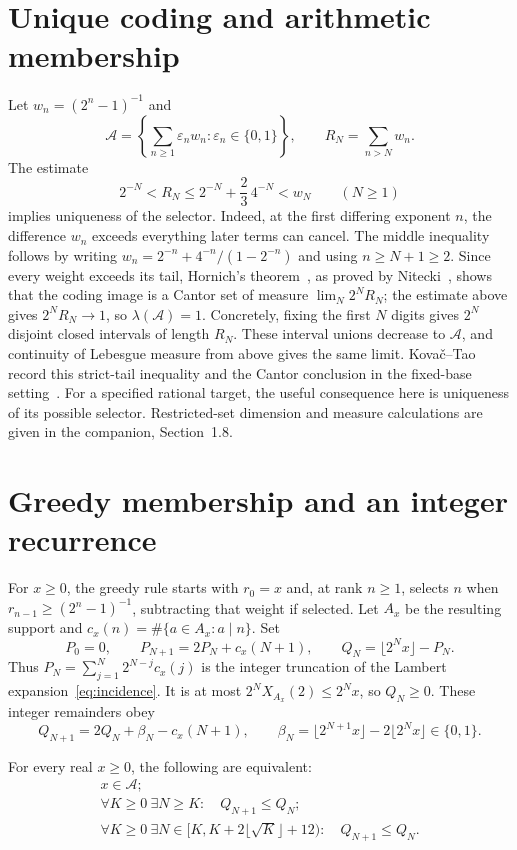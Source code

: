 \documentclass[11pt]{article}
\newcommand{\Ach}{\mathcal A}
\begin{document}
\section{Unique coding and arithmetic membership}\label{sec:geometry}
Let $w_n=(2^n-1)^{-1}$ and
\[
 \Ach=\left\{\sum_{n\ge1}\varepsilon_nw_n:
                   \varepsilon_n\in\{0,1\}\right\},\qquad
 R_N=\sum_{n>N}w_n.
\]
The estimate
\[
 2^{-N}<R_N\le2^{-N}+\frac23\,4^{-N}<w_N\qquad(N\ge1)
\]
implies uniqueness of the selector.  Indeed, at the first differing
exponent $n$, the difference $w_n$ exceeds everything later terms can
cancel.  The middle inequality follows by writing
$w_n=2^{-n}+4^{-n}/(1-2^{-n})$ and using $n\ge N+1\ge2$.
Since every weight exceeds its tail, Hornich's theorem~\cite{hornich1941}, as proved by
Nitecki~\cite[Theorem~4(1), p.~9]{nitecki2013}, shows that the coding image is
a Cantor set of measure $\lim_N2^NR_N$; the estimate above gives
$2^NR_N\to1$, so $\lambda(\Ach)=1$.
Concretely, fixing the first $N$ digits gives $2^N$ disjoint closed
intervals of length $R_N$.  These interval unions decrease to $\Ach$,
and continuity of Lebesgue measure from above gives the same limit.
Kova\v{c}--Tao record this strict-tail inequality and the Cantor conclusion in the fixed-base setting~\cite[Remark~4.1]{kovactao}.
For a specified rational target, the useful consequence here is
uniqueness of its possible selector.  Restricted-set dimension and
measure calculations are given in the companion, Section~1.8.

\section{Greedy membership and an integer recurrence}\label{sec:actual-repairs}
For $x\ge0$, the greedy rule starts with $r_0=x$ and, at rank $n\ge1$,
selects $n$ when $r_{n-1}\ge(2^n-1)^{-1}$, subtracting that weight if
selected.  Let $A_x$ be the resulting support and
$c_x(n)=\#\{a\in A_x:a\mid n\}$.  Set
\[
 P_0=0,\qquad P_{N+1}=2P_N+c_x(N+1),\qquad
 Q_N=\lfloor2^Nx\rfloor-P_N.
\]
Thus $P_N=\sum_{j=1}^N2^{N-j}c_x(j)$ is the integer truncation of the
Lambert expansion~\eqref{eq:incidence}.  It is at most
$2^NX_{A_x}(2)\le2^Nx$, so $Q_N\ge0$.  These integer remainders obey
\begin{equation}
 Q_{N+1}=2Q_N+\beta_N-c_x(N+1),\qquad
 \beta_N=\lfloor2^{N+1}x\rfloor-2\lfloor2^Nx\rfloor\in\{0,1\}.
 \label{eq:actual-repair-recurrence}
\end{equation}

\begin{theorem}\label{res:general-repair}
For every real $x\ge0$, the following are equivalent:
\[
 \begin{gathered}
 x\in\Ach;\\
 \forall K\ge0\ \exists N\ge K:\quad Q_{N+1}\le Q_N;\\
 \forall K\ge0\ \exists N\in[K,K+2\lfloor\sqrt K\rfloor+12):
 \quad Q_{N+1}\le Q_N.
 \end{gathered}
\]
\end{theorem}
\end{document}

